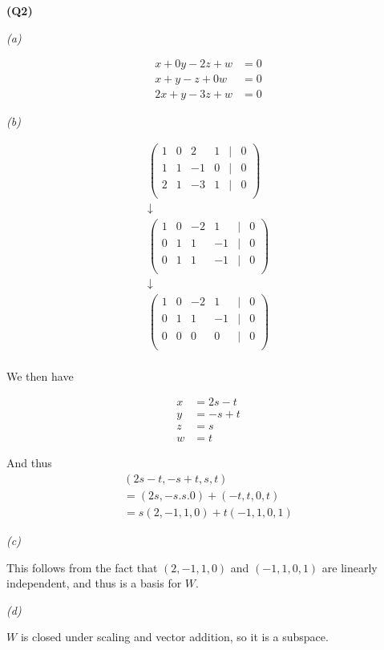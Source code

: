 \documentclass[12pt, a4paper]{article}
\begin{document}
\textbf{(Q2)}

\textit{(a)}

\begin{align*}
    x + 0y - 2z + w & = 0\\
    x + y - z + 0w & = 0\\
    2x + y - 3z + w & = 0
\end{align*}

\textit{(b)}

\begin{gather*}
    \begin{pmatrix}
        1 & 0 & 2 & 1 & \vert & 0\\
        1 & 1 & -1 & 0 & \vert & 0\\
        2 & 1 & -3 & 1 & \vert & 0\\
    \end{pmatrix}\\
    \downarrow\\
    \begin{pmatrix}
        1 & 0 & -2 & 1 & \vert & 0\\
        0 & 1 & 1 & -1 & \vert & 0\\
        0 & 1 & 1 & -1 & \vert & 0\\
    \end{pmatrix}\\
    \downarrow\\
    \begin{pmatrix}
        1 & 0 & -2 & 1 & \vert & 0\\
        0 & 1 & 1 & -1 & \vert & 0\\
        0 & 0 & 0 & 0 & \vert & 0\\
    \end{pmatrix}\\
\end{gather*}

We then have

\begin{align*}
    x & = 2s - t\\
    y & = -s + t\\
    z & = s\\
    w & = t
\end{align*}

And thus
\begin{gather*}
    (2s - t, -s + t, s, t)\\
    = (2s, -s. s. 0) + (-t, t, 0, t)\\
    = s(2, -1, 1, 0) + t(-1, 1, 0, 1)
\end{gather*}

\textit{(c)}

This follows from the fact that $(2, -1, 1, 0)$ and $(-1, 1, 0, 1)$
are linearly independent, and thus is a basis for $W$.

\textit{(d)}

$W$ is closed under scaling and vector addition, so it is a subspace.
\end{document}
